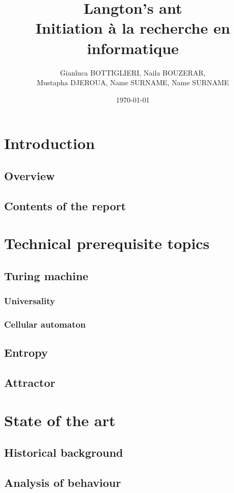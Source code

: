 \documentclass{article}
\title{Langton's ant \\ \large Initiation à la recherche en informatique}
\author{Gianluca BOTTIGLIERI, Naila BOUZERAR, \\ Mustapha DJEROUA, Name SURNAME, Name SURNAME}
\date{\today}
\begin{document}
\maketitle

\newpage

\tableofcontents

\newpage

\tableofcontents

\section{Introduction}
\subsection{Overview}
\subsection{Contents of the report}

\section{Technical prerequisite topics}
\subsection{Turing machine}
\subsubsection{Universality}
\subsubsection{Cellular automaton}
\subsection{Entropy}
\subsection{Attractor}

\section{State of the art}
\subsection{Historical background}
\subsection{Analysis of behaviour}
\end{document}
